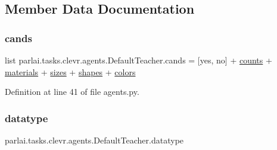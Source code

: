 \subsection{Member Data Documentation}
\mbox{\label{classparlai_1_1tasks_1_1clevr_1_1agents_1_1DefaultTeacher_ac6422c7d4dc173edcbafae2ce5f2552b}} 
\subsubsection{\texorpdfstring{cands}{cands}}
{\footnotesize\ttfamily list parlai.\+tasks.\+clevr.\+agents.\+Default\+Teacher.\+cands = \mbox{[}\textquotesingle{}yes\textquotesingle{}, \textquotesingle{}no\textquotesingle{}\mbox{]} + \hyperlink{namespaceparlai_1_1tasks_1_1clevr_1_1agents_addbc9f5c2379e29136fbbf55b1dfb333}{counts} + \hyperlink{namespaceparlai_1_1tasks_1_1clevr_1_1agents_a73f08794aae5cb7c2a5cc9d1d662e082}{materials} + \hyperlink{namespaceparlai_1_1tasks_1_1clevr_1_1agents_a565c7b5d57a9f93a062d7a130f6ba989}{sizes} + \hyperlink{namespaceparlai_1_1tasks_1_1clevr_1_1agents_ac54e3cd91825301baef61b929e13c0b4}{shapes} + \hyperlink{namespaceparlai_1_1tasks_1_1clevr_1_1agents_a18c5435aea4ab46265cd4c70c7f04718}{colors}\hspace{0.3cm}{\ttfamily [static]}}



Definition at line 41 of file agents.\+py.

\mbox{\label{classparlai_1_1tasks_1_1clevr_1_1agents_1_1DefaultTeacher_a7bdb21c7cb0d04c3470c069125ea3d4a}} 
\subsubsection{\texorpdfstring{datatype}{datatype}}
{\footnotesize\ttfamily parlai.\+tasks.\+clevr.\+agents.\+Default\+Teacher.\+datatype}



